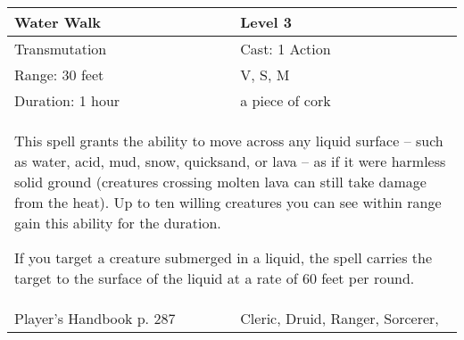 \documentclass[11pt]{report}
\begin{document}
\begin{table}[H]
	\begin{tabular}{||p{6cm}|p{6cm}||}
		\hline\hline
		\bf{Water Walk} & Level 3\\ \hline
		Transmutation & Cast: 1 Action\\ \hline
		Range: 30 feet & V, S, M\\ \hline
		Duration: 1 hour & a piece of cork\\ \hline
		\multicolumn{2}{||p{12cm}||}{This spell grants the ability to move across any liquid surface – such as water, acid, mud, snow, quicksand, or lava – as if it were harmless solid ground (creatures crossing molten lava can still take damage from the heat).
Up to ten willing creatures you can see within range gain this ability for the duration.

If you target a creature submerged in a liquid, the spell carries the target to the surface of the liquid at a rate of 60 feet per round.}\\ \hline
Player's Handbook p. 287 & Cleric, Druid, Ranger, Sorcerer, \\ \hline\hline
	\end{tabular}
\end{table}
\end{document}
